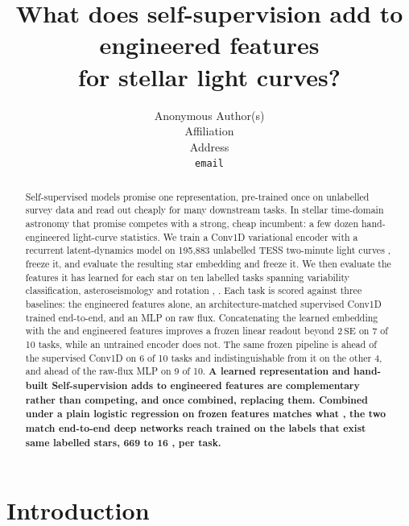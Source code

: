 \documentclass{article}
\title{What does self-supervision add to engineered features\\for stellar light curves?}
\author{Anonymous Author(s)\\Affiliation\\Address\\\texttt{email}}
\providecommand{\DIFaddtex}[1]{{\protect\color{blue} \sf #1}} %
\providecommand{\DIFdeltex}[1]{{\protect\color{red} \scriptsize #1}} %
\providecommand{\DIFaddbegin}{} %
\providecommand{\DIFaddend}{} %
\providecommand{\DIFdelbegin}{} %
\providecommand{\DIFdelend}{} %
\providecommand{\DIFadd}[1]{\texorpdfstring{\DIFaddtex{#1}}{#1}} %
\providecommand{\DIFdel}[1]{\texorpdfstring{\DIFdeltex{#1}}{}} %
\providecommand{\DIFscaledelfig}{0.5}
\newlength{\DIFdelgraphicswidth} %
\newlength{\DIFdelgraphicsheight} %
\providecommand{\DIFaddincludegraphics}[2][]{{\color{blue}\fbox{\DIFOincludegraphics[#1]{#2}}}} %
\providecommand{\DIFdelincludegraphics}[2][]{%
\sbox{\DIFdelgraphicsbox}{\DIFOincludegraphics[#1]{#2}}%
\settoboxwidth{\DIFdelgraphicswidth}{\DIFdelgraphicsbox} %
\settoboxtotalheight{\DIFdelgraphicsheight}{\DIFdelgraphicsbox} %
\scalebox{\DIFscaledelfig}{%
\parbox[b]{\DIFdelgraphicswidth}{\usebox{\DIFdelgraphicsbox}\\[-\baselineskip] \rule{\DIFdelgraphicswidth}{0em}}\llap{\resizebox{\DIFdelgraphicswidth}{\DIFdelgraphicsheight}{%
\setlength{\unitlength}{\DIFdelgraphicswidth}%
\begin{picture}(1,1)%
\thicklines\linethickness{2pt} %
{\color[rgb]{1,0,0}\put(0,0){\framebox(1,1){}}}%
{\color[rgb]{1,0,0}\put(0,0){\line( 1,1){1}}}%
{\color[rgb]{1,0,0}\put(0,1){\line(1,-1){1}}}%
\end{picture}%
}\hspace*{3pt}}} %
} %
\DeclareRobustCommand{\DIFaddbegin}{\DIFOaddbegin \let\includegraphics\DIFaddincludegraphics} %
\DeclareRobustCommand{\DIFaddend}{\DIFOaddend \let\includegraphics\DIFOincludegraphics} %
\DeclareRobustCommand{\DIFdelbegin}{\DIFOdelbegin \let\includegraphics\DIFdelincludegraphics} %
\DeclareRobustCommand{\DIFdelend}{\DIFOaddend \let\includegraphics\DIFOincludegraphics} %
\begin{document}
\maketitle

\begin{abstract}
Self-supervised models promise one representation, pre-trained once on unlabelled survey data and
read out cheaply for many downstream tasks. In stellar time-domain astronomy that promise competes
with a strong, cheap incumbent: a few dozen hand-engineered light-curve statistics. We train a
Conv1D variational encoder with a recurrent latent-dynamics model on 195{,}883 unlabelled TESS
two-minute light curves \DIFdelbegin \DIFdel{, freeze it, and evaluate the resulting star embedding }\DIFdelend \DIFaddbegin \DIFadd{and freeze it. We then evaluate the features it has learned for each star }\DIFaddend on
ten labelled tasks spanning variability classification, asteroseismology and rotation\DIFdelbegin \DIFdel{, }\DIFdelend \DIFaddbegin \DIFadd{. Each task is
scored }\DIFaddend against three baselines: the engineered features alone, an architecture-matched supervised
Conv1D trained end-to-end, and an MLP on raw flux. Concatenating the learned \DIFdelbegin \DIFdel{embedding with the }\DIFdelend \DIFaddbegin \DIFadd{and }\DIFaddend engineered features
improves a frozen linear readout beyond $2\,\mathrm{SE}$ on 7 of 10 tasks, while an untrained encoder
does not. The
same frozen pipeline is ahead of the supervised Conv1D on 6 of 10 tasks and indistinguishable from it
on the other 4, and ahead of the raw-flux MLP on 9 of 10. \textbf{\DIFdelbegin \DIFdel{A learned representation and hand-built }\DIFdelend \DIFaddbegin \DIFadd{Self-supervision adds to engineered }\DIFaddend features \DIFdelbegin \DIFdel{are
complementary }\DIFdelend rather than \DIFdelbegin \DIFdel{competing, and once combined, }\DIFdelend \DIFaddbegin \DIFadd{replacing them. Combined under a
}\DIFaddend plain logistic regression\DIFdelbegin \DIFdel{on frozen
features matches what }\DIFdelend \DIFaddbegin \DIFadd{, the two match }\DIFaddend end-to-end deep networks \DIFdelbegin \DIFdel{reach }\DIFdelend \DIFaddbegin \DIFadd{trained }\DIFaddend on the \DIFdelbegin \DIFdel{labels that exist}\DIFdelend \DIFaddbegin \DIFadd{same labelled stars,
669 to 16}{\DIFadd{,}}\DIFadd{002 per task}\DIFaddend .}
\end{abstract}

\section{Introduction}
\end{document}
